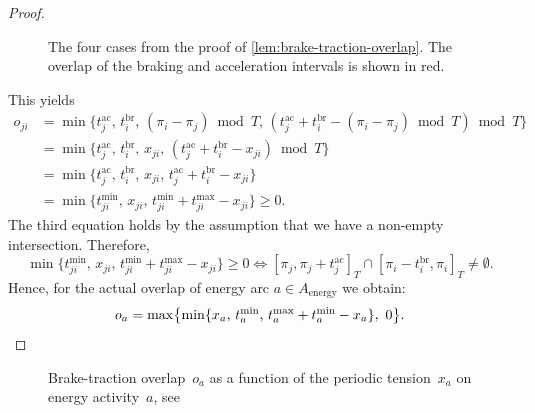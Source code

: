 \documentclass[11pt,a4paper]{article}
\newcommand{\energy}{\mathrm{energy}}
\newcommand{\possenergyact}{A_{\energy}} %
\newcommand{\ac}{\mathrm{ac}}
\newcommand{\br}{\mathrm{br}}
\theoremstyle{definition}
\theoremstyle{remark}
\begin{document}
\begin{proof}
\begin{figure}
     \caption{The four cases from the proof of \cref{lem:brake-traction-overlap}. The overlap of the braking and acceleration intervals is shown in red.}
     \label{fig:cases-overlap}
    \end{figure}
    This yields
	\begin{align*}
		o_{ji} &= \min \{t_j^{\ac},\, t_i^{\br},\, (\pi_i - \pi_j) \bmod T,\, (t_j^{\ac} + t_i^{\br} - (\pi_i - \pi_j) \bmod T) \bmod T \} \\
		&= \min \{t_j^{\ac},\, t_i^{\br},\, x_{ji},\, (t_j^{\ac} + t_i^{\br} - x_{ji}) \bmod T \} \\
		&= \min \{t_j^{\ac},\, t_i^{\br},\, x_{ji},\, t_j^{\ac} + t_i^{\br} - x_{ji} \}\\
		&= \min \{t_{ji}^{\min},\, x_{ji},\, t_{ji}^{\min} + t_{ji}^{\max} - x_{ji} \} \ge 0.
	\end{align*} 
	The third equation holds by the assumption that we have a non-empty intersection.	Therefore,
	\[\min\{t_{ji}^{\min},\, x_{ji},\, t_{ji}^{\min} + t_{ji}^{\max} - x_{ji}\} \ge 0 \iff [\pi_j, \pi_j + t_j^{\ac}]_T \cap [\pi_i - t_i^{\br}, \pi_i]_T \neq \emptyset.\]
	Hence, for the actual overlap of energy arc $a \in \possenergyact$ we obtain:
	\[o_{a} = \max\bigl\{ \min \{ x_a,\, t^{\min}_a,\, t^{\max}_a + t^{\min}_a - x_a\},\ 0\bigr\}. \qedhere\]
\end{proof}

\begin{figure}
    \centering
    \caption{Brake-traction overlap~$o_a$ as a function of the periodic tension~$x_a$ on energy activity~$a$, see \cite{atmos}}
    \label{fig:overlap}
\end{figure}
\end{document}
